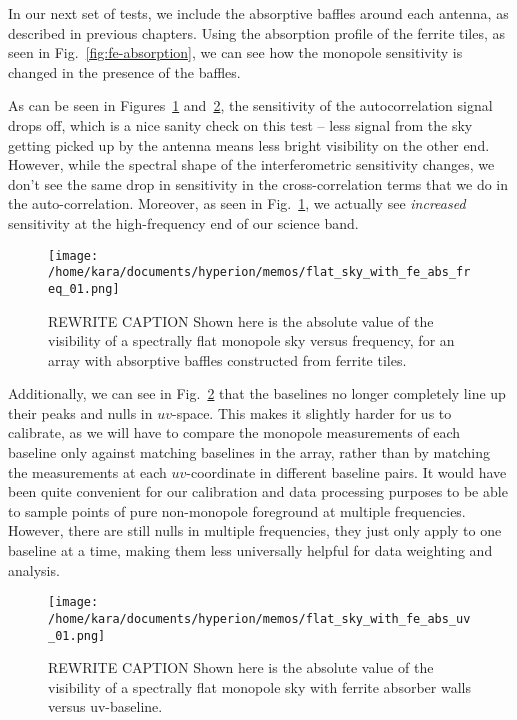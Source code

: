 In our next set of tests, we include the absorptive baffles around each 
antenna, as described in previous chapters. Using the absorption profile of the 
ferrite tiles, as seen in Fig.~\ref{fig:fe-absorption}, we can see how the 
monopole sensitivity is changed in the presence of the baffles.

As can be seen in Figures~\ref{fig:flat-sky-fe-abs-freq} 
and~\ref{fig:flat-sky-fe-abs-uv}, the sensitivity of the autocorrelation signal 
drops off, which is a nice sanity check on this test -- less signal from the 
sky getting picked up by the antenna means less bright visibility on the other 
end. However, while the spectral shape of the interferometric sensitivity 
changes, we don't see the same drop in sensitivity in the cross-correlation 
terms that we do in the auto-correlation. Moreover, as seen in 
Fig.~\ref{fig:flat-sky-fe-abs-freq}, we actually see \emph{increased} 
sensitivity at the high-frequency end of our science band.

\begin{figure}
    \begin{center}
    \texttt{[image: /home/kara/documents/hyperion/memos/flat\_sky\_with\_fe\_abs\_freq\_01.png]}
    \end{center}
    \caption{
        REWRITE CAPTION
        Shown here is the absolute value of the visibility of a spectrally flat 
        monopole sky versus frequency, for an array with absorptive baffles 
        constructed from ferrite tiles.
    }
    \label{fig:flat-sky-fe-abs-freq}
\end{figure}

Additionally, we can see in Fig.~\ref{fig:flat-sky-fe-abs-uv} that the 
baselines no longer completely line up their peaks and nulls in $uv$-space.  
This makes it slightly harder for us to calibrate, as we will have to compare 
the monopole measurements of each baseline only against matching baselines in 
the array, rather than by matching the measurements at each $uv$-coordinate in 
different baseline pairs. It would have been quite convenient for our 
calibration and data processing purposes to be able to sample points of pure 
non-monopole foreground at multiple frequencies. However, there are still nulls 
in multiple frequencies, they just only apply to one baseline at a time, making 
them less universally helpful for data weighting and analysis.

\begin{figure}
    \begin{center}
    \texttt{[image: /home/kara/documents/hyperion/memos/flat\_sky\_with\_fe\_abs\_uv\_01.png]}
    \end{center}
    \caption{
        REWRITE CAPTION
        Shown here is the absolute value of the visibility of a spectrally flat 
        monopole sky with ferrite absorber walls versus uv-baseline.
    }
    \label{fig:flat-sky-fe-abs-uv}
\end{figure}

